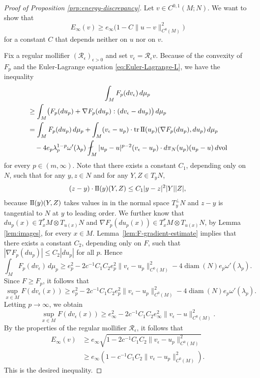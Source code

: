 \documentclass[10pt,a4paper]{amsart}
\newcommand{\vol}{\mathrm{vol}}
\newcommand{\sff}{\mathrm{I{\mkern -1mu}I}}
\DeclareMathOperator{\tr}{tr}
\DeclareMathOperator{\diam}{diam}
\begin{document}
\begin{proof}[Proof of Proposition \ref{prp:energy-discrepancy}]
Let $v \in C^{0, 1}(M; N)$. We want to show that
\[
E_\infty(v) \ge e_\infty\bigl(1 - C\|u - v\|_{C^0(M)}^2\bigr)
\]
for a constant $C$ that depends neither on $u$ nor on $v$.

Fix a regular mollifier $(\mathcal{R}_\epsilon)_{\epsilon > 0}$ and set $v_\epsilon = \mathcal{R}_\epsilon v$.
Because of the convexity of $F_p$ and the Euler-Lagrange equation \eqref{eq:Euler-Lagrange-L},
we have the inequality
\begin{multline*}
\int_M F_p(dv_\epsilon) \, d\mu_p \\
\begin{aligned}
& \ge \int_M \bigl(F_p(du_p) + \nabla F_p(du_p) : (dv_\epsilon - du_p)\bigr) \, d\mu_p \\
& = \int_M F_p(du_p) \, d\mu_p + \int_M (v_\epsilon - u_p) \cdot \tr \sff(u_p)(\nabla F_p(du_p), du_p) \, d\mu_p \\
& \quad - 4 e_p \lambda_p^{1 - p} \omega'(\lambda_p) \fint_M |u_p - u|^{p - 2} (v_\epsilon - u_p) \cdot d\pi_N(u_p)(u_p - u) \, d\vol
\end{aligned}
\end{multline*}
for every $p \in (m, \infty)$. Note that there exists a constant $C_1$, depending only on $N$,
such that for any $y, z \in N$ and for any $Y, Z \in T_yN$,
\[
(z - y) \cdot \sff(y)(Y, Z) \le C_1 |y - z|^2 |Y| |Z|,
\]
because $\sff(y)(Y, Z)$ takes values in in the normal space $T_y^\perp N$ and
$z - y$ is tangential to $N$ at $y$ to leading order. We further know that
$du_p(x) \in T_x^*M \otimes T_{u(x)} N$ and $\nabla F_p(du_p(x)) \in T_x^*M \otimes T_{u(x)} N$,
by Lemma \ref{lem:images}, for every $x \in M$. Lemma~\ref{lem:F-gradient-estimate} implies that
there exists a constant $C_2$, depending only on $F$, such that $|\nabla F_p(du_p)| \le C_2|du_p|$
for all $p$. Hence
\[
\int_M F_p(dv_\epsilon) \, d\mu_p \ge e_p^2 - 2c^{-1} C_1C_2 e_p^2 \|v_\epsilon - u_p\|_{C^0(M)}^2 - 4\diam(N) e_p \omega'(\lambda_p).
\]
Since $F \ge F_p$, it follows that
\[
\sup_{x \in M} F(dv_\epsilon(x)) \ge e_p^2 - 2c^{-1} C_1C_2 e_p^2 \|v_\epsilon - u_p\|_{C^0(M)}^2 - 4\diam(N) e_p \omega'(\lambda_p).
\]
Letting $p \to \infty$, we obtain
\[
\sup_{x \in M} F(dv_\epsilon(x)) \ge e_\infty^2 - 2c^{-1} C_1C_2 e_\infty^2 \|v_\epsilon - u\|_{C^0(M)}^2.
\]
By the properties of the regular mollifier $\mathcal{R}_\epsilon$, it follows that
\[
\begin{split}
E_\infty(v) & \ge e_\infty \sqrt{1 - 2c^{-1} C_1C_2 \|v_\epsilon - u_p\|_{C^0(M)}^2} \\
& \ge e_\infty \left(1 - c^{-1} C_1C_2 \|v_\epsilon - u_p\|_{C^0(M)}^2\right).
\end{split}
\]
This is the desired inequality.
\end{proof}
\end{document}
